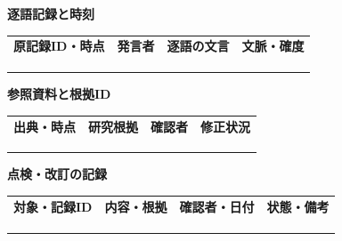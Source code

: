 \documentclass[11pt,a4paper]{article}
\begin{document}
\par{}\noindent\textbf{逐語記録と時刻}\par\vspace{1mm}
{\fontsize{8.5}{13}\selectfont
\begin{tabularx}{\linewidth}{@{}XXXX@{}}
\textbf{原記録ID・時点} & \textbf{発言者} & \textbf{逐語の文言} & \textbf{文脈・確度}\\[2mm]
\strut & \strut & \strut & \strut\\[5mm]
\strut & \strut & \strut & \strut\\[5mm]
\strut & \strut & \strut & \strut\\[5mm]
\end{tabularx}
}\vspace{2mm}\par
{}
\par{}\noindent\textbf{参照資料と根拠ID}\par\vspace{1mm}
{\fontsize{8.5}{13}\selectfont
\begin{tabularx}{\linewidth}{@{}XXXX@{}}
\textbf{出典・時点} & \textbf{研究根拠} & \textbf{確認者} & \textbf{修正状況}\\[2mm]
\strut & \strut & \strut & \strut\\[5mm]
\strut & \strut & \strut & \strut\\[5mm]
\strut & \strut & \strut & \strut\\[5mm]
\end{tabularx}
}\vspace{2mm}\par
{}
\par{}\noindent\textbf{点検・改訂の記録}\par\vspace{1mm}
{\fontsize{8.5}{13}\selectfont
\begin{tabularx}{\linewidth}{@{}XXXX@{}}
\textbf{対象・記録ID} & \textbf{内容・根拠} & \textbf{確認者・日付} & \textbf{状態・備考}\\[2mm]
\strut & \strut & \strut & \strut\\[5mm]
\strut & \strut & \strut & \strut\\[5mm]
\strut & \strut & \strut & \strut\\[5mm]
\end{tabularx}
}\vspace{2mm}\par
\end{document}
